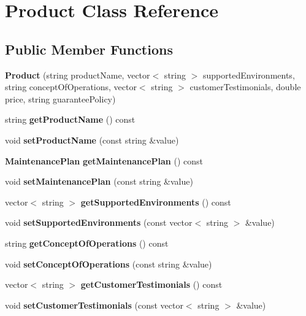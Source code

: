 \section{Product Class Reference}
\label{class_product}
\subsection*{Public Member Functions}
\begin{DoxyCompactItemize}
\item 
\mbox{\label{class_product_a503ef6e972ef8291bac3a58005a90461}} 
{\bfseries Product} (string product\+Name, vector$<$ string $>$ supported\+Environments, string concept\+Of\+Operations, vector$<$ string $>$ customer\+Testimonials, double price, string guarantee\+Policy)
\item 
\mbox{\label{class_product_a2a0d54576aeee9eee76290969e5af9d8}} 
string {\bfseries get\+Product\+Name} () const
\item 
\mbox{\label{class_product_a8f3dca390696b30b717bb530a97ef847}} 
void {\bfseries set\+Product\+Name} (const string \&value)
\item 
\mbox{\label{class_product_a2191f3774c1f47a0a0e8e6efea3849af}} 
\textbf{ Maintenance\+Plan} {\bfseries get\+Maintenance\+Plan} () const
\item 
\mbox{\label{class_product_a46b4a8aa2f77ff627dd1f55735b1d486}} 
void {\bfseries set\+Maintenance\+Plan} (const string \&value)
\item 
\mbox{\label{class_product_ac2d8eacf4ac9a4288719eb8dbf96d347}} 
vector$<$ string $>$ {\bfseries get\+Supported\+Environments} () const
\item 
\mbox{\label{class_product_a6f3721d0f4088242069dd45f3499ffbe}} 
void {\bfseries set\+Supported\+Environments} (const vector$<$ string $>$ \&value)
\item 
\mbox{\label{class_product_a6df501cb30bb07ce60f19c5b33e96c1a}} 
string {\bfseries get\+Concept\+Of\+Operations} () const
\item 
\mbox{\label{class_product_a527d5d8f428fff5b498b6cade92c8d51}} 
void {\bfseries set\+Concept\+Of\+Operations} (const string \&value)
\item 
\mbox{\label{class_product_a92048482d629389a6ea05912dafe66a1}} 
vector$<$ string $>$ {\bfseries get\+Customer\+Testimonials} () const
\item 
\mbox{\label{class_product_a7a780a8c725062642108d286bbb7418f}} 
void {\bfseries set\+Customer\+Testimonials} (const vector$<$ string $>$ \&value)

\end{DoxyCompactItemize}
